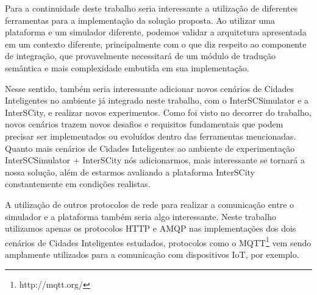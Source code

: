 Para a continuidade deste trabalho seria interessante a utilização de diferentes ferramentas para a implementação da solução proposta.
Ao utilizar uma plataforma e um simulador diferente, podemos validar a arquitetura apresentada em um contexto diferente, principalmente com o que diz respeito ao componente de integração, que provavelmente
necessitará de um módulo de tradução semântica e mais complexidade embutida em sua implementação.

Nesse sentido, também seria interessante adicionar novos cenários de Cidades Inteligentes no ambiente já integrado neste trabalho, com o InterSCSimulator e a InterSCity, e realizar novos experimentos.
Como foi visto no decorrer do trabalho, novos cenários trazem novos desafios e requisitos fundamentais que podem precisar ser implementados ou evoluídos dentro das ferramentas mencionadas.
Quanto mais cenários de Cidades Inteligentes ao ambiente de experimentação InterSCSimulator + InterSCity nós adicionarmos, mais interessante se tornará a nossa solução, além de estarmos avaliando a
plataforma InterSCity constantemente em condições realistas.

A utilização de outros protocolos de rede para realizar a comunicação entre o simulador e a plataforma também seria algo interessante.
Neste trabalho utilizamos apenas os protocolos HTTP e AMQP nas implementações dos dois cenários de Cidades Inteligentes estudados, protocolos como o MQTT\footnote{http://mqtt.org/} vem sendo amplamente
utilizados para a comunicação com dispositivos IoT, por exemplo.
